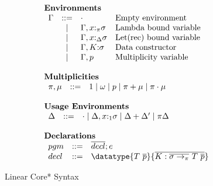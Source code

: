 \begin{figure}[h]
\begin{framed}
\[\begin{array}{l}
\begin{array}{lcll}
\end{array}\\\\
%
\textbf{Environments}\\
\begin{array}{lcll}
  \Gamma   & ::=  & \cdot                                 & \textrm{Empty environment} \\
           & \mid & \Gamma,x{:}_\pi\sigma                 & \textrm{Lambda bound variable} \\
           & \mid & \Gamma,x{:}_\Delta\sigma              & \textrm{Let(rec) bound variable}\\
           & \mid & \Gamma,K{:}\sigma                     & \textrm{Data constructor}\\
           & \mid & \Gamma,p                              & \textrm{Multiplicity variable}\\
\end{array}\\\\
%
\textbf{Multiplicities}\\
\begin{array}{lcll}
  \pi, \mu & ::= & 1 \mid \omega \mid p \mid \pi + \mu \mid \pi \cdot \mu\\
\end{array}\\\\
%
\textbf{Usage Environments}\\
\begin{array}{lcl}
  \Delta & ::= & \cdot \mid \Delta, x{:}_1\sigma \mid \Delta+\Delta' \mid \pi\Delta\\
\end{array}\\\\
%
\textbf{Declarations}\\
\begin{array}{lcl}
  pgm & ::= & \overline{decl}; e \\
  decl & ::= & \datatype{T~\overline{p}}{\overline{K:\overline{\sigma \to_\pi}~T~\overline{p}}}
\end{array}
%
\end{array}
\]
\end{framed}
\caption{Linear Core* Syntax}
\label{linear-core-syntax}
\end{figure}

